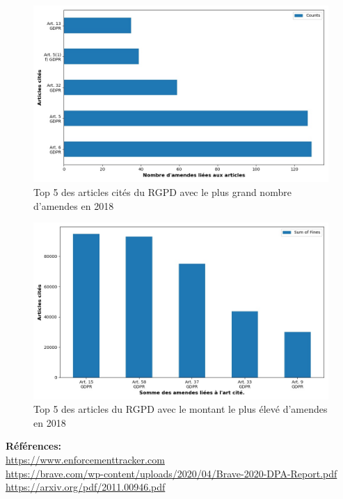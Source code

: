 \documentclass[french]{article}
\begin{document}
	\begin{multicols}{2}
	\begin{figure}
		[H]\centering\includegraphics[width=1.0\linewidth]{graphs/top10_quoted_year}
		\caption{Top 5 des articles cités du RGPD avec le plus grand nombre d'amendes en 2018}
	\end{figure}
	\begin{figure}
		[H]\centering\includegraphics[width=1\linewidth]{graphs/top10_quoted_year_fines}
		\caption{Top 5 des articles  du RGPD avec le montant le plus élevé d'amendes en 2018}
	 \end{figure}
	
	\end{multicols}









\vspace*{\fill}
\textbf{Références:}\\
\href{https://www.enforcementtracker.com}{https://www.enforcementtracker.com}\\
\href{https://brave.com/wp-content/uploads/2020/04/Brave-2020-DPA-Report.pdf}{https://brave.com/wp-content/uploads/2020/04/Brave-2020-DPA-Report.pdf}\\
\href{https://arxiv.org/pdf/2011.00946.pdf}{https://arxiv.org/pdf/2011.00946.pdf}
\end{document}
